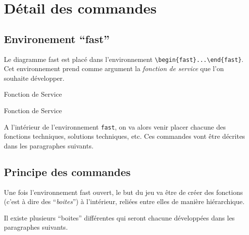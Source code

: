 \section{Détail des commandes}\label{commandes}


	\subsection{Environement ``fast''}\label{environnement}

		Le diagramme fast est placé dans l'environnement {\color{blue}\verb'\begin{fast}...\end{fast}'}.
		Cet environnement prend comme argument la \emph{fonction de service} que l'on souhaite développer.

\begin{code}%
\begin{fast}{Fonction de Service}
\end{fast}
\end{code}%
		\cqd
\begin{exemple}
\begin{fast}{Fonction de Service}
\end{fast}
\end{exemple}

		A l'intérieur de l'environnement \verb!fast!, on va alors venir placer chacune des fonctions techniques, solutions techniques, etc.
		Ces commandes vont être décrites dans les paragraphes suivants.





	\subsection{Principe des commandes}\label{principe}

		Une fois l'environnement fast ouvert, le but du jeu va être de créer des fonctions (c'est à dire des ``\emph{boites}'') à l'intérieur, reliées entre elles de manière hiérarchique.

		Il existe plusieurs ``boites'' différentes qui seront chacune développées dans les paragraphes suivants.

